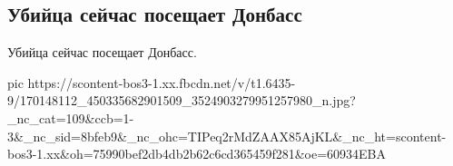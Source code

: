  
 
 
 
 
\subsection{Убийца сейчас посещает Донбасс}
\label{sec:08_04_2021.fb.storozhenko_denis.1.ubijca_zelja_donbass}

Убийца сейчас посещает Донбасс.

\ifcmt
  pic https://scontent-bos3-1.xx.fbcdn.net/v/t1.6435-9/170148112_450335682901509_3524903279951257980_n.jpg?_nc_cat=109&ccb=1-3&_nc_sid=8bfeb9&_nc_ohc=TIPeq2rMdZAAX85AjKL&_nc_ht=scontent-bos3-1.xx&oh=75990bef2db4db2b62c6cd365459f281&oe=60934EBA
\fi

